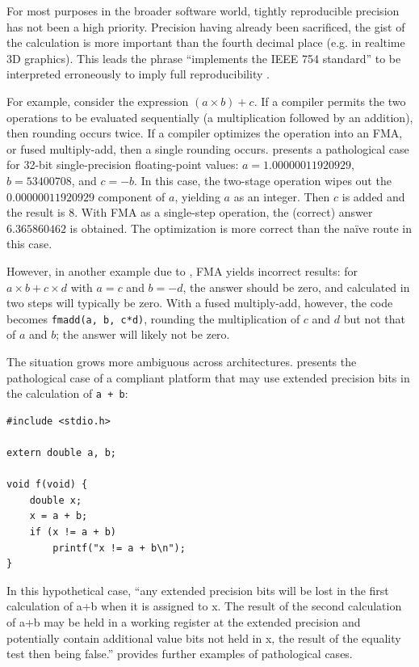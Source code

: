 \documentclass[twoside]{article}
\begin{document}
For most purposes in the broader software world, tightly reproducible precision has not been a high priority.  Precision having already been sacrificed, the gist of the calculation is more important than the fourth decimal place (e.g. in realtime 3D graphics).  This leads the phrase “implements the IEEE 754 standard” to be interpreted erroneously to imply full reproducibility \citep{Figueroa2000}.

For example, consider the expression $(a \times b) + c$.  If a compiler permits the two operations to be evaluated sequentially (a multiplication followed by an addition), then rounding occurs twice.  If a compiler optimizes the operation into an FMA, or fused multiply-add, then a single rounding occurs.  \citeauthor{Peters2021} presents a pathological case for 32-bit single-precision floating-point values:  $a = 1.00000011920929$, $b = 53400708$, and $c = -b$.  In this case, the two-stage operation wipes out the $0.00000011920929$ component of $a$, yielding $a$ as an integer.  Then $c$ is added and the result is $8$.  With FMA as a single-step operation, the (correct) answer $6.365860462$ is obtained.  The optimization is more correct than the naïve route in this case.

However, in another example due to \citeauthor{Dawson2013}, FMA yields incorrect results:  for $a \times b + c \times d$ with $a = c$ and $b = -d$, the answer should be zero, and calculated in two steps will typically be zero.  With a fused multiply-add, however, the code becomes \texttt{fmadd(a, b, c*d)}, rounding the multiplication of $c$ and $d$ but not that of $a$ and $b$; the answer will likely not be zero.

The situation grows more ambiguous across architectures.  \citet[p.~346]{Jones2008} presents the pathological case of a compliant platform that may use extended precision bits in the calculation of \texttt{a + b}:

\lstset{language=C}
\begin{lstlisting}
#include <stdio.h>

extern double a, b;

void f(void) {
    double x;
    x = a + b;
    if (x != a + b)
        printf("x != a + b\n");
}
\end{lstlisting}

\noindent
In this hypothetical case, “any extended precision bits will be lost in the first calculation of a+b when it is assigned to x. The result of the second calculation of a+b may be held in a working register at the extended precision and potentially contain additional value bits not held in x, the result of the equality test then being false.”  \citet{Higham2002} provides further examples of pathological cases.
\end{document}
